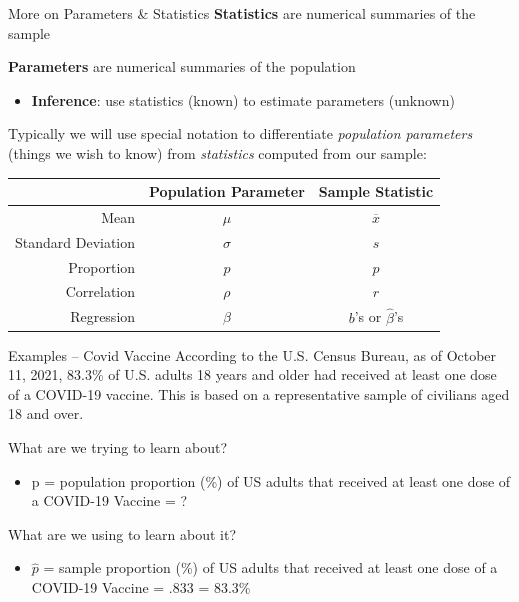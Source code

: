 \documentclass{beamer}
\begin{document}
\begin{frame}{More on Parameters \& Statistics}
\textbf{Statistics} are numerical summaries of the sample

\textbf{Parameters} are numerical summaries of the population
\begin{itemize}
    \item \textbf{Inference}: use statistics (known) to estimate parameters (unknown)
\end{itemize} \vspace{8mm}

Typically we will use special notation to differentiate \textit{population parameters} (things we wish to know) from \textit{statistics} computed from our sample:

\begin{table}[ht]
\centering
\begin{tabular}{rcc}
  \hline
 & Population Parameter & Sample Statistic \\ 
  \hline
Mean &   $\mu$ &   $\overline{x}$ \\ 
Standard Deviation &  $\sigma$ &   $s$ \\ 
Proportion & $p$ & $\hat{p}$ \\
Correlation & $\rho$ & $r$ \\
Regression & $\beta$ & $b$'s or $\hat{\beta}$'s \\
   \hline
\end{tabular}
\end{table}
\end{frame}

\begin{frame}{Examples -- Covid Vaccine}
According to the U.S. Census Bureau, as of October 11, 2021, 83.3\% of U.S. adults 18 years and older had received at least one dose of a COVID-19 vaccine. This is based on a representative sample of civilians aged 18 and over. \vspace{10mm}

What are we trying to learn about?
\begin{itemize}
    \item p = population proportion (\%) of US adults that received at least one dose of a COVID-19 Vaccine = ?
\end{itemize} \vspace{3mm}

What are we using to learn about it?
\begin{itemize}
    \item $\widehat{p}$ = sample proportion (\%) of US adults that received at least one dose of a COVID-19 Vaccine = .833 = 83.3\%
\end{itemize}
\end{frame}
\end{document}
